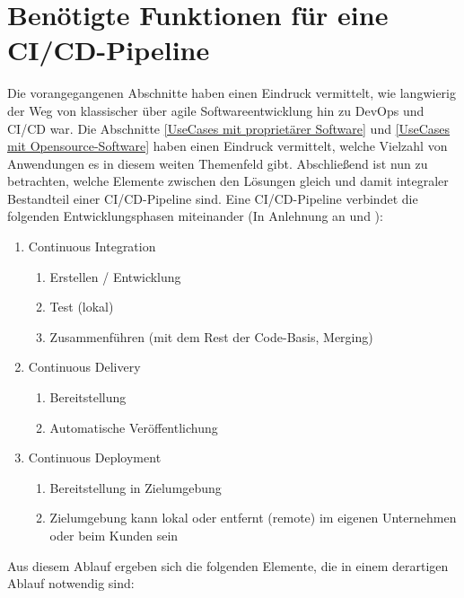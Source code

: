 \section{Benötigte Funktionen für eine CI/CD-Pipeline}
\label{Benoetigte Funktionen für eine CI/CD-Pipeline}
Die vorangegangenen Abschnitte haben einen Eindruck vermittelt, wie langwierig der Weg von klassischer über agile Softwareentwicklung hin zu \gls{DevOps} und \acrshort{CI}/\acrshort{CD} war. Die Abschnitte \ref{UseCases mit proprietärer Software}  und \ref{UseCases mit Opensource-Software} haben einen Eindruck vermittelt, welche Vielzahl von Anwendungen es in diesem weiten Themenfeld gibt. Abschließend ist nun zu betrachten, welche Elemente zwischen den Lösungen gleich und damit integraler Bestandteil einer \acrshort{CI}/\acrshort{CD}-Pipeline sind.\newline
Eine \acrshort{CI}/\acrshort{CD}-Pipeline \glqq{}verbindet\grqq{} die folgenden Entwicklungsphasen miteinander (In Anlehnung an \cite{redhat_cicd_pipline} und \cite{meyer_continuous_2014}):
\begin{enumerate}
    \item Continuous Integration
    \begin{enumerate}
        \item Erstellen / Entwicklung
        \item Test (lokal)
        \item Zusammenführen (mit dem Rest der Code-Basis, \glqq{}Merging\grqq{})
    \end{enumerate}
    \item Continuous Delivery
        \begin{enumerate}
        \item Bereitstellung
        \item Automatische Veröffentlichung 
    \end{enumerate}
    \item Continuous Deployment
        \begin{enumerate}
        \item Bereitstellung in Zielumgebung
        \item Zielumgebung kann lokal oder entfernt (remote) im eigenen Unternehmen oder beim Kunden sein
    \end{enumerate}
\end{enumerate}
Aus diesem Ablauf ergeben sich die folgenden Elemente, die in einem derartigen Ablauf notwendig sind:
